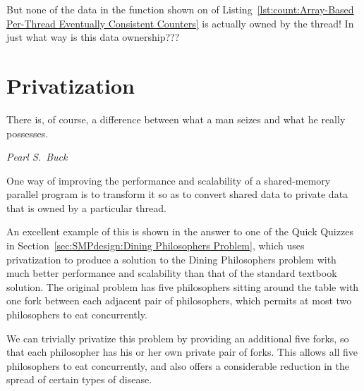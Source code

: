 \QuickQuiz{}
	\begin{fcvref}
	But none of the data in the  function shown on
	 of
	Listing~\ref{lst:count:Array-Based Per-Thread Eventually Consistent Counters}
	is actually owned by the  thread!
	In just what way is this data ownership???
	\end{fcvref}
 \QuickQuizEnd

\section{Privatization}
\label{sec:owned:Privatization}
%
\epigraph{There is, of course, a difference between what a man seizes
	  and what he really possesses.}
	 {\emph{Pearl S.~Buck}}

One way of improving the performance and scalability of a shared-memory
parallel program is to transform it so as to convert shared data to
private data that is owned by a particular thread.

An excellent example of this is shown in the answer to one of the
Quick Quizzes in
Section~\ref{sec:SMPdesign:Dining Philosophers Problem},
which uses privatization to produce a solution to the
Dining Philosophers problem with much better performance and scalability
than that of the standard textbook solution.
The original problem has five philosophers sitting around the table
with one fork between each adjacent pair of philosophers, which permits
at most two philosophers to eat concurrently.

We can trivially privatize this problem by providing an additional five
forks, so that each philosopher has his or her own private pair of forks.
This allows all five philosophers to eat concurrently, and also offers
a considerable reduction in the spread of certain types of disease.

